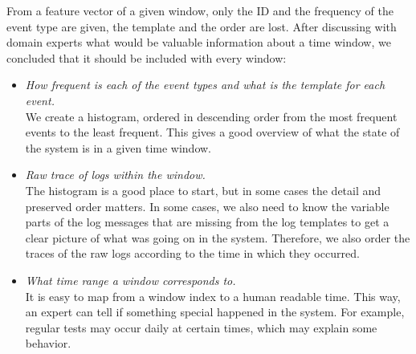 From a feature vector of a given window, only the ID and the frequency of the event type are given, the template and the order are lost.
After discussing with domain experts what would be valuable information about a time window, we concluded that it should be included with every window:
\begin{itemize}
    \item \textit{How frequent is each of the event types and what is the template for each event.}\\
    We create a histogram, ordered in descending order from the most frequent events to the least frequent. This gives a good overview of what the state of the system is in a given time window. 
    \item \textit{Raw trace of logs within the window.}\\
    The histogram is a good place to start, but in some cases the detail and preserved order matters. In some cases, we also need to know the variable parts of the log messages that are missing from the log templates to get a clear picture of what was going on in the system. Therefore, we also order the traces of the raw logs according to the time in which they occurred.
    \item \textit{What time range a window corresponds to.}\\
    It is easy to map from a window index to a human readable time. This way, an expert can tell if something special happened in the system. For example, regular tests may occur daily at certain times, which may explain some behavior.
\end{itemize}
 

